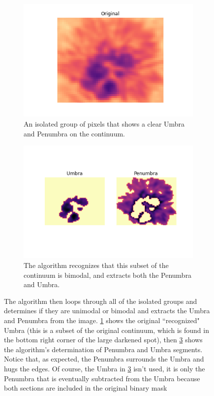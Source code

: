 \documentclass[defaultstyle,11pt]{thesis}
\begin{document}
\begin{enumerate}
\begin{figure}[h]
\centering
\begin{subfigure}[b]{.45\textwidth}
  \centering
  \includegraphics[width=.8\linewidth]{ThesisFilePkg/figures/data/Original_33.0.png}
  \caption{An isolated group of pixels that shows a clear Umbra and Penumbra on the continuum.}
  \label{fig:UmbraPenumbraorig}
\end{subfigure}%
\quad
\begin{subfigure}[b]{.45\textwidth}
  \centering
  \includegraphics[width=.8\linewidth]{ThesisFilePkg/figures/data/segments_33.0.png}
  \caption{The algorithm recognizes that this subset of the continuum is bimodal, and extracts both the Penumbra and Umbra.}
  \label{fig:UmbraPenumbraseg}
\end{subfigure}
\caption{The algorithm then loops through all of the isolated groups and determines if they are unimodal or bimodal and extracts the Umbra and Penumbra from the image. \ref{fig:UmbraPenumbraorig} shows the original ``recognized" Umbra (this is a subset of the original continuum, which is found in the bottom right corner of the large darkened spot), then \ref{fig:UmbraPenumbraseg} shows the algorithm's determination of Penumbra and Umbra segments. Notice that, as expected, the Penumbra surrounds the Umbra and hugs the edges. Of course, the Umbra in \ref{fig:UmbraPenumbraseg} isn't used, it is only the Penumbra that is eventually subtracted from the Umbra because both sections are included in the original binary mask}
\end{figure}
    
    
\end{enumerate}
\end{document}
